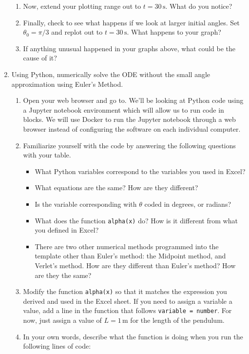 \documentclass{article}
\begin{document}
\begin{enumerate}
\begin{enumerate}
        \item Now, extend your plotting range out to $t=30 \,\mathrm{s}$. What do you notice? 
        \item Finally, check to see what happens if we look at larger initial angles. Set $\theta_0 = \pi/3$ and replot out to $t = 30\,\mathrm{s}$. What happens to your graph?
        \item If anything unusual happened in your graphs above, what could be the cause of it? 
    \end{enumerate}
    \item Using Python, numerically solve the ODE without the small angle approximation using Euler’s Method. 
    \begin{enumerate}
        \item Open your web browser and go to\href{}{}. We’ll be looking at Python code using a Jupyter notebook environment which will allow us to run code in blocks. We will use Docker to run the Jupyter notebook through a web browser instead of configuring the software on each individual computer. 
        \item Familiarize yourself with the code by answering the following questions with your table.
        \begin{itemize}
            \item What Python variables correspond to the variables you used in Excel?
            \item What equations are the same? How are they different?
            \item Is the variable corresponding with $\theta$ coded in degrees, or radians?
            \item What does the function \verb!alpha(x)! do? How is it different from what you defined in Excel?
            \item There are two other numerical methods programmed into the template other than Euler’s method: the Midpoint method, and Verlet’s method. How are they different than Euler’s method? How are they the same?
        \end{itemize}
        \item Modify the function \verb!alpha(x)! so that it matches the expression you derived and used in the Excel sheet. If you need to assign a variable a value, add a line in the function that follows \verb!variable = number!. For now, just assign a value of $L = 1\,\mathrm{m}$ for the length of the pendulum. 
        \item In your own words, describe what the function is doing when you run the following lines of code:

\end{enumerate}
\end{enumerate}
\end{document}
